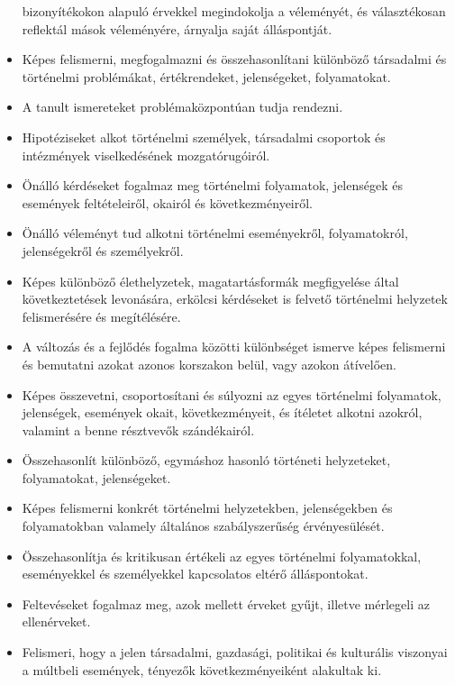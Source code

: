 \begin{itemize}
  bizonyítékokon alapuló érvekkel megindokolja a véleményét, és
  választékosan reflektál mások véleményére, árnyalja saját
  álláspontját.
\item
  Képes felismerni, megfogalmazni és összehasonlítani különböző
  társadalmi és történelmi problémákat, értékrendeket, jelenségeket,
  folyamatokat.
\item
  A tanult ismereteket problémaközpontúan tudja rendezni.
\item
  Hipotéziseket alkot történelmi személyek, társadalmi csoportok és
  intézmények viselkedésének mozgatórugóiról.
\item
  Önálló kérdéseket fogalmaz meg történelmi folyamatok, jelenségek és
  események feltételeiről, okairól és következményeiről.
\item
  Önálló véleményt tud alkotni történelmi eseményekről, folyamatokról,
  jelenségekről és személyekről.
\item
  Képes különböző élethelyzetek, magatartásformák megfigyelése által
  következtetések levonására, erkölcsi kérdéseket is felvető történelmi
  helyzetek felismerésére és megítélésére.
\item
  A változás és a fejlődés fogalma közötti különbséget ismerve képes
  felismerni és bemutatni azokat azonos korszakon belül, vagy azokon
  átívelően.
\item
  Képes összevetni, csoportosítani és súlyozni az egyes történelmi
  folyamatok, jelenségek, események okait, következményeit, és ítéletet
  alkotni azokról, valamint a benne résztvevők szándékairól.
\item
  Összehasonlít különböző, egymáshoz hasonló történeti helyzeteket,
  folyamatokat, jelenségeket.
\item
  Képes felismerni konkrét történelmi helyzetekben, jelenségekben és
  folyamatokban valamely általános szabályszerűség érvényesülését.
\item
  Összehasonlítja és kritikusan értékeli az egyes történelmi
  folyamatokkal, eseményekkel és személyekkel kapcsolatos eltérő
  álláspontokat.
\item
  Feltevéseket fogalmaz meg, azok mellett érveket gyűjt, illetve
  mérlegeli az ellenérveket.
\item
  Felismeri, hogy a jelen társadalmi, gazdasági, politikai és kulturális
  viszonyai a múltbeli események, tényezők következményeiként alakultak
  ki.
\end{itemize}
